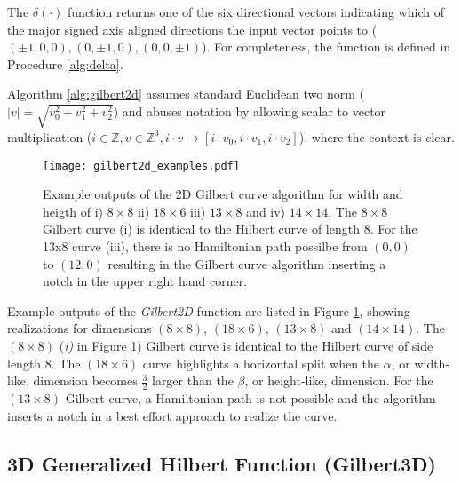 The $\delta(\cdot)$ function returns one of the six directional vectors indicating which of
the major signed axis aligned directions the input vector points to ($(\pm1,0,0), (0,\pm1,0),(0,0,\pm1)$).
For completeness, the function is defined in Procedure \ref{alg:delta}.

Algorithm \ref{alg:gilbert2d} assumes standard Euclidean two norm ($|v| = \sqrt{v_0^2 + v_1^2 + v_2^2}$)
and abuses notation by allowing scalar to vector multiplication ($i \in \mathbb{Z}, v \in \mathbb{Z}^3, i \cdot v \to [ i \cdot v_0, i \cdot v_1, i \cdot v_2 ]$).
where the context is clear.

\begin{figure}[h]
  \centering
  \texttt{[image: gilbert2d\_examples.pdf]}
  \caption{ Example outputs of the 2D Gilbert curve algorithm for width and heigth of i) $8 \times 8$ ii) $18 \times 6$ iii) $13 \times 8$ and iv) $14 \times 14$.
            The $8 \times 8$ Gilbert curve (i) is identical to the Hilbert curve of length $8$.
            For the 13x8 curve (iii), there is no Hamiltonian path possilbe from $(0,0)$ to $(12,0)$ resulting in the Gilbert curve algorithm inserting a notch
            in the upper right hand corner. }
  \label{fig:gilbert2d_examples}
\end{figure}

Example outputs of the \textit{Gilbert2D} function are listed in Figure \ref{fig:gilbert2d_examples}, showing realizations for dimensions
$(8 \times 8)$, $(18 \times 6)$, $(13 \times 8)$ and $(14 \times 14)$.
The $(8 \times 8)$ (\textit{i)} in Figure \ref{fig:gilbert2d_examples}) Gilbert curve is identical to the Hilbert curve of side length 8.
The $(18 \times 6)$ curve highlights a horizontal split when the $\alpha$, or width-like, dimension becomes $\frac{3}{2}$ larger than the
$\beta$, or height-like, dimension.
For the $(13 \times 8)$ Gilbert curve, a Hamiltonian path is not possible and the algorithm inserts a notch in a best effort approach to realize the curve.


\subsection{3D Generalized Hilbert Function (Gilbert3D)}


